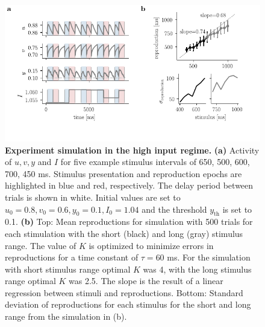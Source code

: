 \documentclass[10pt]{article}
\begin{document}
\begin{figure}[ht]
	\centering
	\includegraphics{figures/highI.pdf}
	\caption{\textbf{Experiment simulation in the high input regime.} 
	\textbf{(a)} Activity of $u, v, y$ and $I$ for five example stimulus intervals of 650, 500, 600, 700, 450 ms. Stimulus presentation and reproduction epochs are highlighted in blue and red, respectively. The delay period between trials is shown in white. Initial values are set to $u_0=0.8 , v_0=0.6 , y_0=0.1, I_0=1.04$ and the threshold $y_{\text{th}}$ is set to 0.1. 
	\textbf{(b)} Top: Mean reproductions for simulation with 500 trials for each stimulation with the short (black) and long (gray) stimulus range. The value of $K$ is optimized to minimize errors in reproductions for a time constant of $\tau = 60$ ms. For the simulation with short stimulus range optimal $K$ was 4, with the long stimulus range optimal $K$ was 2.5.
		The slope is the result of a linear regression between stimuli and reproductions.
		Bottom: Standard deviation of reproductions for each stimulus for the short and long range from the simulation in (b).
	}
\label{highI}
\end{figure}
\end{document}
